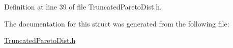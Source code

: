 Definition at line 39 of file Truncated\+Pareto\+Dist.\+h.



The documentation for this struct was generated from the following file\+:\begin{DoxyCompactItemize}
\item 
\hyperlink{TruncatedParetoDist_8h}{Truncated\+Pareto\+Dist.\+h}\end{DoxyCompactItemize}
